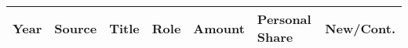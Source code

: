 
\begin{longtable}{p{1.75cm}>{\raggedright}p{2.75cm}p{5.5cm}p{1cm}p{1.25cm}p{1.25cm}p{1cm}}
Year & Source & Title & Role & Amount & Personal Share & New/Cont.\\
\hline 
\endhead 
\end{longtable}


